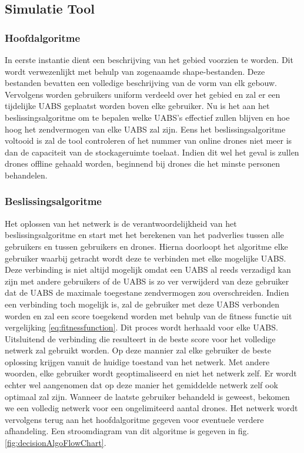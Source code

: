 \documentclass[twocolumn]{phdsymp_dutch}
\begin{document}
\subsection{Simulatie Tool}

\subsubsection{Hoofdalgoritme}
In eerste instantie dient een beschrijving van het gebied voorzien te worden. Dit wordt verwezenlijkt met behulp van 
zogenaamde shape-bestanden. Deze bestanden bevatten een volledige beschrijving van de vorm van elk gebouw. Vervolgens 
worden gebruikers uniform verdeeld over het gebied en zal er een tijdelijke \gls{UABS} geplaatst worden boven elke gebruiker.
Nu is het aan het beslissingsalgoritme om te bepalen welke \gls{UABS}'s effectief zullen blijven en hoe hoog het zendvermogen van elke \gls{UABS}
zal zijn. Eens het beslissingsalgoritme voltooid is zal de tool controleren of het nummer van online drones niet meer is dan 
de capaciteit van de stockageruimte toelaat. Indien dit wel het geval is zullen drones offline gehaald worden, beginnend bij 
drones die het minste personen behandelen.

\subsubsection{Beslissingsalgoritme}

Het oplossen van het netwerk is de verantwoordelijkheid van het beslissingsalgoritme en start met het berekenen van het padverlies tussen 
alle gebruikers en tussen gebruikers en drones. Hierna doorloopt het algoritme elke gebruiker waarbij getracht wordt deze te verbinden 
met elke mogelijke \gls{UABS}. Deze verbinding is niet altijd mogelijk omdat een \gls{UABS} al reeds verzadigd kan zijn met andere gebruikers of 
de \gls{UABS} is zo ver verwijderd van deze gebruiker dat de \gls{UABS} de maximale toegestane zendvermogen zou overschreiden.
Indien een verbinding toch mogelijk is, zal de gebruiker met deze \gls{UABS} verbonden worden en zal een score toegekend worden met behulp van 
de fitness functie uit vergelijking \ref{eq:fitnessfunction}. 
Dit proces wordt herhaald voor elke \gls{UABS}. Uitsluitend de verbinding die resulteert in de beste score voor het volledige netwerk 
zal gebruikt worden. 
Op deze mannier zal elke gebruiker de beste oplossing krijgen vanuit de huidige toestand van het netwerk.
Met andere woorden, elke gebruiker wordt geoptimaliseerd en niet het netwerk zelf. Er wordt echter wel aangenomen dat 
op deze manier het gemiddelde netwerk zelf ook optimaal zal zijn.
Wanneer de laatste gebruiker behandeld is geweest, bekomen we een volledig netwerk voor een ongelimiteerd aantal drones.
Het netwerk wordt vervolgens terug aan het hoofdalgoritme gegeven voor eventuele verdere afhandeling.
Een stroomdiagram van dit algoritme is gegeven in fig. \ref{fig:decisionAlgoFlowChart}.
\end{document}
